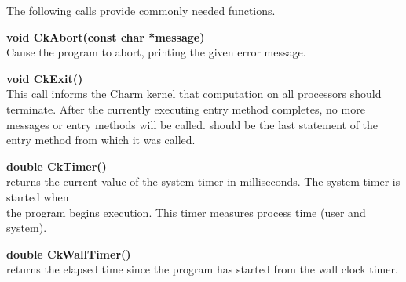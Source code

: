 The following calls provide commonly needed functions.

{\bf void CkAbort(const char *message)}  \\
Cause the program to abort, printing the given error message.

{\bf void CkExit()}  \\
This call informs the Charm kernel that computation on all processors should 
terminate.  After the currently executing entry method completes, no more 
messages or entry methods will be called.   should be the 
last statement of the entry method from which it was called. 

{\bf double CkTimer()}   \\
returns the current value of the system timer in milliseconds. The system
timer is started when \\
the program begins execution. This timer measures
process time (user and system).

{\bf double CkWallTimer()}   \\
returns the elapsed time since the program has started from the wall clock 
timer.

